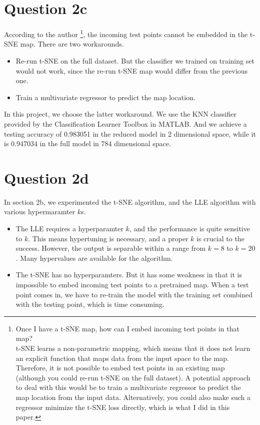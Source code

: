 \documentclass{article}
\begin{document}
\section*{Question 2c}
{
    According to the author
    \footnote
    {
        Once I have a t-SNE map, how can I embed incoming test points in that map? \\
        t-SNE learns a non-parametric mapping, which means that it does not learn an explicit function that maps data from the input space to the map. 
        Therefore, it is not possible to embed test points in an existing map (although you could re-run t-SNE on the full dataset). 
        A potential approach to deal with this would be to train a multivariate regressor to predict the map location from the input data. 
        Alternatively, you could also make such a regressor minimize the t-SNE loss directly, which is what I did in this paper.
    },
    the incoming test points cannot be embedded in the t-SNE map. There are two workarounds.
    \begin{itemize}
        \item Re-run t-SNE on the full dataset. But the classifier we trained on training set would not work, since the re-run t-SNE map would differ from the previous one.
        \item Train a multivariate regressor to predict the map location.
    \end{itemize}

    In this project, we choose the latter workaround. We use the KNN classifier provided by the Classification Learner Toolbox in MATLAB. 
    And we achieve a testing accuracy of 0.983051 in the reduced model in 2 dimensional space, while it is 0.947034 in the full model in 784 dimensional space. 
}

\section*{Question 2d}
{
    In section 2b, we experimented the t-SNE algorithm, and the LLE algorithm with various hypermaramter $k$s. 

    \begin{itemize}
        \item The LLE requires a hyperparamter $k$, and the performance is quite sensitive to $k$. This means hypertuning is necessary, and a proper $k$ is crucial to the success.
        However, the output is separable within a range from $k=8$ to $k=20$. Many hypervalues are available for the algorithm.
        
        \item The t-SNE has no hyperparamters. But it has some weakness in that it is impossible to embed incoming test points to a pretrained map. 
        When a test point comes in, we have to re-train the model with the training set combined with the testing point, which is time consuming.
    \end{itemize}
}
\end{document}
